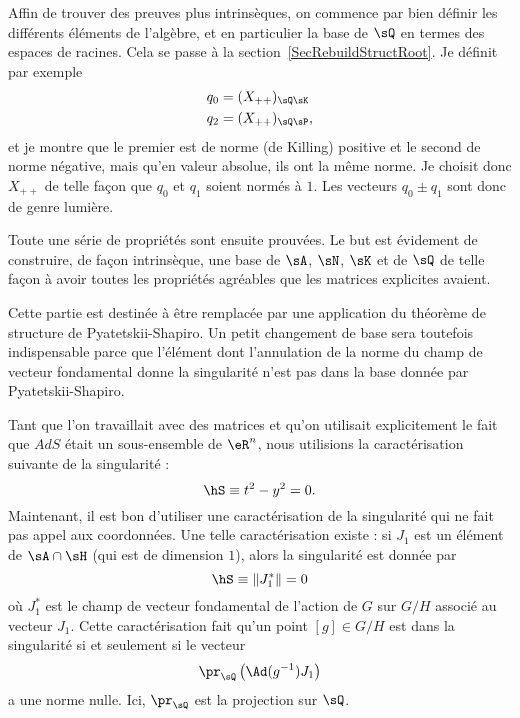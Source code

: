 Affin de trouver des preuves plus intrinsèques, on commence par bien définir les différents éléments de l'algèbre, et en particulier la base de $\sQ$ en termes des espaces de racines. Cela se passe à la section~\ref{SecRebuildStructRoot}. Je définit par exemple
\begin{equation}
	\begin{aligned}[]
		q_0&=(X_{++})_{\sQ\sK}\\
		q_2&=(X_{++})_{\sQ\sP},
	\end{aligned}
\end{equation}
et je montre que le premier est de norme (de Killing) positive et le second de norme négative, mais qu'en valeur absolue, ils ont la même norme. Je choisit donc $X_{++}$ de telle façon que $q_0$ et $q_1$ soient normés à $1$. Les vecteurs $q_0\pm q_1$ sont donc de genre lumière.

Toute une série de propriétés sont ensuite prouvées. Le but est évidement de construire, de façon intrinsèque, une base de $\sA$, $\sN$, $\sK$ et de $\sQ$ de telle façon à avoir toutes les propriétés agréables que les matrices explicites avaient.

Cette partie est destinée à être remplacée par une application du théorème de structure de Pyatetskii-Shapiro. Un petit changement de base sera toutefois indispensable parce que l'élément dont l'annulation de la norme du champ de vecteur fondamental donne la singularité n'est pas dans la base donnée par Pyatetskii-Shapiro.

Tant que l'on travaillait avec des matrices et qu'on utilisait explicitement le fait que $AdS$ était un sous-ensemble de $\eR^n$, nous utilisions la caractérisation suivante de la singularité :
\begin{equation}
	\hS\equiv t^2-y^2=0.
\end{equation}
Maintenant, il est bon d'utiliser une caractérisation de la singularité qui ne fait pas appel aux coordonnées. Une telle caractérisation existe : si $J_1$ est un élément de $\sA\cap\sH$ (qui est de dimension $1$), alors la singularité est donnée par
\begin{equation}
	\hS\equiv \| J_1^* \|=0
\end{equation}
où $J_1^*$ est le champ de vecteur fondamental de l'action de $G$ sur $G/H$ associé au vecteur $J_1$. Cette caractérisation fait qu'un point $[g]\in G/H$ est dans la singularité si et seulement si le vecteur
\begin{equation}		\label{VisiteEqprQcaract}
	\pr_{\sQ}\left( \Ad(g^{-1})J_1 \right)
\end{equation}
a une norme nulle. Ici, $\pr_{\sQ}$ est la projection sur $\sQ$.

